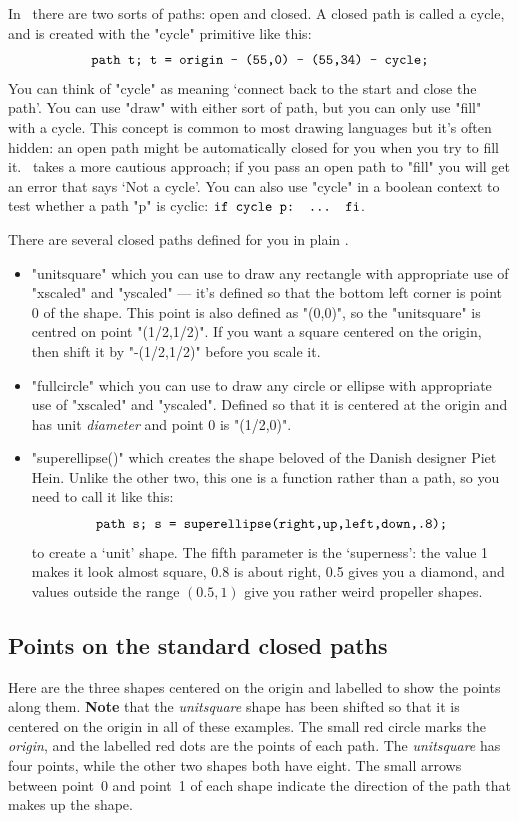 \documentclass[a4paper,landscape]{article}
\def\mpic#1#2{\vadjust{\moveright5.5in\vbox to 0pt{\vskip#1\texttt{[image: \#2]}\vss}}}
\begin{document}
In \MP\ there are two sorts of paths: open and closed.  
\mpic{-12pt}{closed0}
A closed path is called a cycle, and is created with the "cycle" primitive like this:
$$\hbox{\ttfamily path t; t = origin -- (55,0) -- (55,34) -- cycle;}$$
You can think of "cycle" as meaning ‘connect back to the start and close the path’.
You can use "draw" with either sort of path, but you can only use "fill" with a
cycle.  This concept is common to most drawing languages but it’s often hidden:  an
open path might be automatically closed for you when you try to fill it.  \MP\ takes
a more cautious approach; if you pass an open path to "fill" you will get an error
that says ‘Not a cycle’.  You can also use "cycle" in a boolean context to test
whether a path "p" is cyclic: 
$\hbox{\ttfamily if cycle p: ... fi}$.

\medskip\noindent
There are several closed paths defined for you in plain \MP. 
\mpic{1cm}{closed7}
\begin{itemize}
    \item "unitsquare" which you can use to draw any rectangle with appropriate
        use of "xscaled" and "yscaled" --- it’s defined so that the bottom left
        corner is point 0 of the shape.  This point is also defined as "(0,0)", 
        so the "unitsquare" is centred on point "(1/2,1/2)".  If you want a square
        centered on the origin, then shift it by "-(1/2,1/2)" before you scale it.

    \item "fullcircle" which you can use to draw any circle or ellipse with
        appropriate use of "xscaled" and "yscaled".  Defined so that it is centered
        at the origin and has unit \textit{diameter} and point 0 is "(1/2,0)".

    \item "superellipse()" which creates the shape beloved of the Danish designer Piet Hein.  Unlike the
        other two, this one is a function rather than a path, so you need to call it
        like this:
        $$\hbox{\ttfamily path s; s = superellipse(right,up,left,down,.8);}$$
        to create a ‘unit’ shape.  The fifth parameter is the ‘superness’: the value
        1 makes it look almost square, 0.8 is about right, 0.5 gives you a diamond,
        and values outside the range $(0.5,1)$ give you rather weird propeller
        shapes.
\end{itemize}

\newpage\subsection{Points on the standard closed paths}\noindent\mpic{-10pt}{closed1}%
Here are the three shapes centered on the origin and labelled to show the points
along them.  \textbf{Note} that the \textit{unitsquare} shape has been shifted so that it is
centered on the origin in all of these examples.  The small red circle marks the
\textit{origin}, and the labelled red dots are the points of each path.  The
\textit{unitsquare} has four points, while the other two shapes both have eight.
The small
arrows between point~0 and point~1 of each shape indicate the direction of the path
that makes up the shape.  
\end{document}
